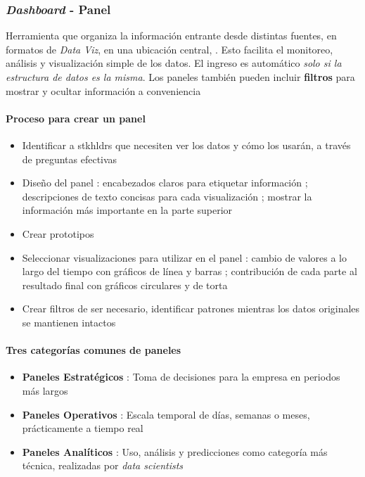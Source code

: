\subsubsection{\textit{Dashboard} - Panel}
Herramienta que organiza la información entrante desde distintas fuentes, en formatos de \textit{Data Viz}, en una ubicación central, . Esto facilita el monitoreo, análisis y visualización simple de los datos. El ingreso es automático \textit{solo si la estructura de datos es la misma}. Los paneles también pueden incluir \textbf{filtros} para mostrar y ocultar información a conveniencia
\paragraph{Proceso para crear un panel}
    \begin{itemize}
        \item {Identificar a \Gls{stkhldrs} que necesiten ver los datos y cómo los usarán, a través de preguntas efectivas}
        \item {Diseño del panel : encabezados claros para etiquetar información ; descripciones de texto concisas para cada visualización ; mostrar la información más importante en la parte superior}
        \item {Crear prototipos}
        \item {Seleccionar visualizaciones para utilizar en el panel : cambio de valores a lo largo del tiempo con gráficos de línea y barras ; contribución de cada parte al resultado final con gráficos circulares y de torta}
        \item {Crear filtros de ser necesario, identificar patrones mientras los datos originales se mantienen intactos}
    \end{itemize}
\paragraph{Tres categorías comunes de paneles}
    \begin{itemize}
        \item {\textbf{Paneles Estratégicos} : Toma de decisiones para la empresa en periodos más largos}
        \item {\textbf{Paneles Operativos} : Escala temporal de días, semanas o meses, prácticamente a tiempo real}
        \item {\textbf{Paneles Analíticos} : Uso, análisis y predicciones como categoría más técnica, realizadas por \textit{data scientists}}
    \end{itemize}